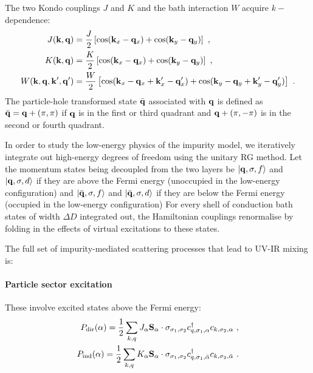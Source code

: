 \documentclass[%
reprint,
superscriptaddress,
groupedaddress,
superscriptaddress,
onecolumn,
10pt
]{revtex4-2}
\begin{document}
The two Kondo couplings \(J\) and \(K\) and the bath interaction \(W\) acquire \(k-\)dependence:
\begin{equation}\begin{aligned}
	J({\bf k}, {\bf q}) &= \frac{J}{2}\left[\cos({\bf k}_x - {\bf q}_x) + \cos({\bf k}_y - {\bf q}_y)\right]~,\\
	K({\bf k}, {\bf q}) &= \frac{K}{2}\left[\cos({\bf k}_x - {\bf q}_x) + \cos({\bf k}_y - {\bf q}_y)\right]~,\\
	W({\bf k}, {\bf q}, {\bf k}^\prime, {\bf q}^\prime) &= \frac{W}{2}\left[\cos({\bf k}_x - {\bf q}_x + {\bf k}^\prime_x - {\bf q}^\prime_x) + \cos({\bf k}_y - {\bf q}_y + {\bf k}^\prime_y - {\bf q}^\prime_y)\right]~.
\end{aligned}\end{equation}
The particle-hole transformed state \(\bar{\bf q}\) associated with \({\bf q}\) is defined as \(\bar {\bf q} = {\bf q} + \left(\pi, \pi\right)\) if \({\bf q}\) is in the first or third quadrant and \({\bf q} + \left(\pi, -\pi\right)\) is in the second or fourth quadrant.

In order to study the low-energy physics of the impurity model, we iteratively integrate out high-energy degrees of freedom using the unitary RG method. Let the momentum states being decoupled from the two layers be \(\ket{{\bf q},\sigma,f}\) and \(\ket{{\bf q},\sigma,d}\) if they are above the Fermi energy (unoccupied in the low-energy configuration) and \(\ket{\bar{\bf q},\sigma,f}\) and \(\ket{\bar{\bf q},\sigma,d}\) if they are below the Fermi energy (occupied in the low-energy configuration)
For every shell of conduction bath states of width \(\Delta D\) integrated out, the Hamiltonian couplings renormalise by folding in the effects of virtual excitations to these states. 

The full set of impurity-mediated scattering processes that lead to UV-IR mixing is:
\paragraph{Particle sector excitation}
These involve excited states above the Fermi energy:
\begin{equation}\begin{aligned}
	P_\text{dir}(\alpha) = \frac{1}{2}\sum_{k, q} J_\alpha {\bf S}_\alpha \cdot {\bf \sigma}_{\sigma_1,\sigma_2} c^\dagger_{q,\sigma_1, \alpha}c_{k,\sigma_2, \alpha}~,\\
	P_\text{ind}(\alpha) = \frac{1}{2}\sum_{k, q} K_{\alpha} {\bf S}_{\alpha} \cdot {\bf \sigma}_{\sigma_1,\sigma_2} c^\dagger_{q,\sigma_1, \bar\alpha}c_{k,\sigma_2, \bar\alpha}~.
\end{aligned}\end{equation}
\end{document}
